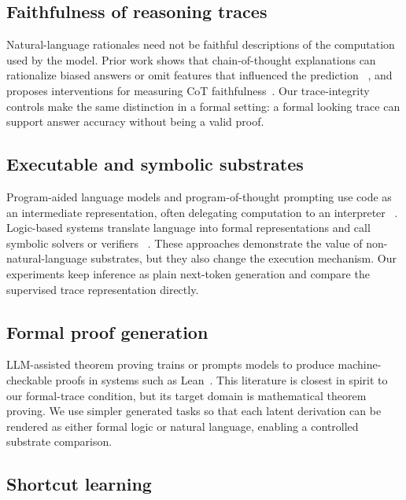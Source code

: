 \documentclass[11pt]{article}
\begin{document}
\subsection{Faithfulness of reasoning traces}

Natural-language rationales need not be faithful descriptions of the computation
used by the model. Prior work shows that chain-of-thought explanations can
rationalize biased answers or omit features that influenced the prediction
~\citep{turpin2023language}, and proposes interventions for measuring CoT
faithfulness~\citep{lanham2023measuring}. Our trace-integrity controls make the
same distinction in a formal setting: a formal looking trace can support answer
accuracy without being a valid proof.

\subsection{Executable and symbolic substrates}

Program-aided language models and program-of-thought prompting use code as an
intermediate representation, often delegating computation to an interpreter
~\citep{gao2023pal,chen2023program}. Logic-based systems translate language
into formal representations and call symbolic solvers or verifiers
~\citep{pan2023logiclm,ling2023deductive}. These approaches demonstrate the
value of non-natural-language substrates, but they also change the execution
mechanism. Our experiments keep inference as plain next-token generation and
compare the supervised trace representation directly.

\subsection{Formal proof generation}

LLM-assisted theorem proving trains or prompts models to produce machine-checkable
proofs in systems such as Lean~\citep{polu2020generative,jiang2022draft,
leandojo2023,leanCopilot2024}. This literature is closest in spirit to our
formal-trace condition, but its target domain is mathematical theorem proving.
We use simpler generated tasks so that each latent derivation can be rendered as
either formal logic or natural language, enabling a controlled substrate
comparison.

\subsection{Shortcut learning}
\end{document}
